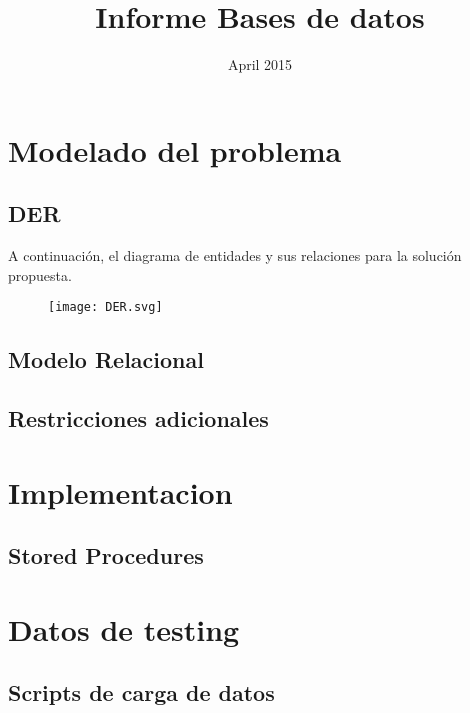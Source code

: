 \documentclass{article}
\title{Informe Bases de datos}
\date{April 2015}
\begin{document}



\begin{titlepage}
\maketitle
\thispagestyle{empty}
\end{titlepage} 

\tableofcontents

\section{Modelado del problema}
\subsection{DER}
A continuación, el diagrama de entidades y sus relaciones para la solución propuesta.
\begin{figure}[h!]
  \centering
    \texttt{[image: DER.svg]}
\end{figure}

\subsection{Modelo Relacional}

\subsection{Restricciones adicionales}

\section{Implementacion}
\subsection{Stored Procedures}

\section{Datos de testing}
\subsection{Scripts de carga de datos}
\end{document}
